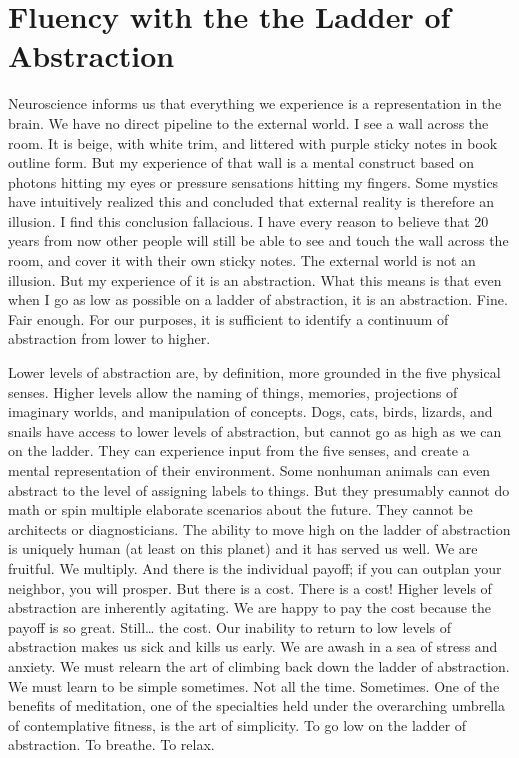 \documentclass[a5paper,10pt,english]{book}
\begin{document}
\section{Fluency with the the Ladder of Abstraction}
\label{\detokenize{main-2:fluency-with-the-the-ladder-of-abstraction}}
\sphinxAtStartPar
Neuroscience informs us that everything we experience is a
representation in the brain. We have no direct pipeline to the external
world. I see a wall across the room. It is beige, with white trim, and
littered with purple sticky notes in book outline form. But my
experience of that wall is a mental construct based on photons hitting
my eyes or pressure sensations hitting my fingers. Some mystics have
intuitively realized this and concluded that external reality is
therefore an illusion. I find this conclusion fallacious. I have every
reason to believe that 20 years from now other people will still be able
to see and touch the wall across the room, and cover it with their own
sticky notes. The external world is not an illusion. But my experience
of it is an abstraction. What this means is that even when I go as low
as possible on a ladder of abstraction, it is  an abstraction.
Fine. Fair enough. For our purposes, it is sufficient to identify a
continuum of abstraction from lower to higher.

\sphinxAtStartPar
Lower levels of abstraction are, by definition, more grounded in the
five physical senses. Higher levels allow the naming of things,
memories, projections of imaginary worlds, and manipulation of concepts.
Dogs, cats, birds, lizards, and snails have access to lower levels of
abstraction, but cannot go as high as we can on the ladder. They can
experience input from the five senses, and create a mental
representation of their environment. Some non\sphinxhyphen{}human animals can even
abstract to the level of assigning labels to things. But they presumably
cannot do math or spin multiple elaborate scenarios about the future.
They cannot be architects or diagnosticians. The ability to move high on
the ladder of abstraction is uniquely human (at least on this planet)
and it has served us well. We are fruitful. We multiply. And there is
the individual payoff; if you can out\sphinxhyphen{}plan your neighbor, you will
prosper. But there is a cost. There is a cost! Higher levels of
abstraction are inherently agitating. We are happy to pay the cost
because the payoff is so great. Still… the cost. Our inability to return
to low levels of abstraction makes us sick and kills us early. We are
awash in a sea of stress and anxiety. We must re\sphinxhyphen{}learn the art of
climbing back down the ladder of abstraction. We must learn to be simple
sometimes. Not all the time. Sometimes. One of the benefits of
meditation, one of the specialties held under the over\sphinxhyphen{}arching umbrella
of contemplative fitness, is the art of simplicity. To go low on the
ladder of abstraction. To breathe. To relax.
\end{document}
